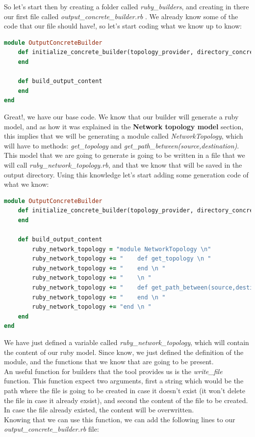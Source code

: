 So let's start then by creating a folder called \textit{ruby\_builders}, and creating in there our first file called \textit{output\_concrete\_builder.rb} . We already know some of the code that our file should have!, so let's start coding what we know up to know:

\begin{lstlisting}[language=Ruby,breaklines=true]
module OutputConcreteBuilder
	def initialize_concrete_builder(topology_provider, directory_concrete_builders, output_directory)
	end
    
    def build_output_content
    end
end
\end{lstlisting}

Great!, we have our base code. We know that our builder will generate a ruby model, and as how it was explained in the \textbf{Network topology model} section, this implies that we will be generating a module called \textit{NetworkTopology}, which will have to methods: \textit{get\_topology} and \textit{get\_path\_between(source,destination)}. This model that we are going to generate is going to be written in a file that we will call \textit{ruby\_network\_topology.rb}, and that we know that will be saved in the output directory. Using this knowledge let's start adding some generation code of what we know:

\begin{lstlisting}[language=Ruby,breaklines=true]
module OutputConcreteBuilder
	def initialize_concrete_builder(topology_provider, directory_concrete_builders, output_directory)
	end
    
    def build_output_content
    	ruby_network_topology = "module NetworkTopology \n"
    	ruby_network_topology += "    def get_topology \n "
    	ruby_network_topology += "    end \n "
    	ruby_network_topology += "    \n "
    	ruby_network_topology += "    def get_path_between(source,destination) \n "
    	ruby_network_topology += "    end \n "
    	ruby_network_topology += "end \n "
    end
end
\end{lstlisting}

We have just defined a variable called \textit{ruby\_network\_topology}, which will contain the content of our ruby model. Since know, we just defined the definition of the module, and the functions that we know that are going to be present. \\
An useful function for builders that the tool provides us is the \textit{write\_file} function. This function expect two arguments, first a string which would be the path where the file is going to be created in case it doesn't exist (it won't delete the file in case it already exsist), and second the content of the file to be created. In case the file already existed, the content will be overwritten.\\
Knowing that we can use this function, we can add the following lines to our \textit{output\_concrete\_builder.rb} file:

